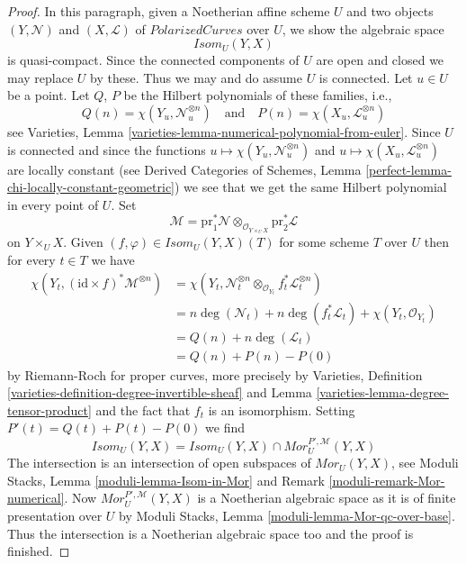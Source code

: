 \documentclass[10pt,a4paper]{amsart}
\theoremstyle{plain}
\theoremstyle{definition}
\theoremstyle{remark}
\numberwithin{equation}{subsection}
\begin{document}
\begin{proof}
\medskip\noindent
In this paragraph, given a Noetherian affine scheme $U$ and two objects
$(Y, \mathcal{N})$ and $(X, \mathcal{L})$
of $\textit{PolarizedCurves}$ over $U$, we show the algebraic space
$$
\mathit{Isom}_U(Y, X)
$$
is quasi-compact. Since the connected components of $U$ are open and closed
we may replace $U$ by these. Thus we may and do assume $U$ is connected.
Let $u \in U$ be a point. Let $Q$, $P$ be the Hilbert polynomials
of these families, i.e.,
$$
Q(n) = \chi(Y_u, \mathcal{N}_u^{\otimes n})
\quad\text{and}\quad
P(n) = \chi(X_u, \mathcal{L}_u^{\otimes n})
$$
see Varieties, Lemma \ref{varieties-lemma-numerical-polynomial-from-euler}.
Since $U$ is connected and since
the functions
$u \mapsto \chi(Y_u, \mathcal{N}_u^{\otimes n})$ and
$u \mapsto \chi(X_u, \mathcal{L}_u^{\otimes n})$
are locally constant (see 
Derived Categories of Schemes, Lemma
\ref{perfect-lemma-chi-locally-constant-geometric})
we see that we get the same Hilbert polynomial in every point of $U$.
Set
$$
\mathcal{M} = \text{pr}_1^*\mathcal{N}
\otimes_{\mathcal{O}_{Y \times_U X}} \text{pr}_2^*\mathcal{L}
$$
on $Y \times_U X$. Given $(f, \varphi) \in \mathit{Isom}_U(Y, X)(T)$
for some scheme $T$ over $U$ then for every $t \in T$ we have
\begin{align*}
\chi(Y_t, (\text{id} \times f)^*\mathcal{M}^{\otimes n})
& =
\chi(Y_t,
\mathcal{N}_t^{\otimes n} \otimes_{\mathcal{O}_{Y_t}}
f_t^*\mathcal{L}_t^{\otimes n}) \\
& =
n\deg(\mathcal{N}_t) + n\deg(f_t^*\mathcal{L}_t) +
\chi(Y_t, \mathcal{O}_{Y_t}) \\
& =
Q(n) + n\deg(\mathcal{L}_t) \\
& =
Q(n) + P(n) - P(0)
\end{align*}
by Riemann-Roch for proper curves, more precisely by
Varieties, Definition \ref{varieties-definition-degree-invertible-sheaf} and
Lemma \ref{varieties-lemma-degree-tensor-product}
and the fact that $f_t$ is an isomorphism.
Setting $P'(t) = Q(t) + P(t) - P(0)$ we find
$$
\mathit{Isom}_U(Y, X) =
\mathit{Isom}_U(Y, X) \cap \mathit{Mor}^{P', \mathcal{M}}_U(Y, X)
$$
The intersection is an intersection of open subspaces of
$\mathit{Mor}_U(Y, X)$, see
Moduli Stacks, Lemma \ref{moduli-lemma-Isom-in-Mor} and
Remark \ref{moduli-remark-Mor-numerical}.
Now $\mathit{Mor}^{P', \mathcal{M}}_U(Y, X)$
is a Noetherian algebraic space as it is of finite
presentation over $U$ by
Moduli Stacks, Lemma \ref{moduli-lemma-Mor-qc-over-base}.
Thus the intersection is a Noetherian algebraic space too
and the proof is finished.
\end{proof}
\end{document}
